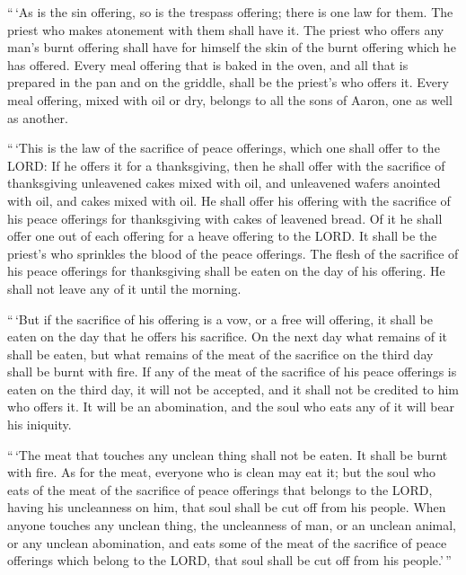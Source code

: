  ``\,`As is the sin offering, so is the trespass offering;
there is one law for them. The priest who makes atonement with them
shall have it.  The priest who offers any man's burnt
offering shall have for himself the skin of the burnt offering which he
has offered.  Every meal offering that is baked in the oven,
and all that is prepared in the pan and on the griddle, shall be the
priest's who offers it.  Every meal offering, mixed with
oil or dry, belongs to all the sons of Aaron, one as well as another.

 ``\,`This is the law of the sacrifice of peace offerings,
which one shall offer to the LORD:  If he offers it for a
thanksgiving, then he shall offer with the sacrifice of thanksgiving
unleavened cakes mixed with oil, and unleavened wafers anointed with
oil, and cakes mixed with oil.  He shall offer his offering
with the sacrifice of his peace offerings for thanksgiving with cakes of
leavened bread.  Of it he shall offer one out of each
offering for a heave offering to the LORD. It shall be the priest's who
sprinkles the blood of the peace offerings.  The flesh of
the sacrifice of his peace offerings for thanksgiving shall be eaten on
the day of his offering. He shall not leave any of it until the morning.

 ``\,`But if the sacrifice of his offering is a vow, or a
free will offering, it shall be eaten on the day that he offers his
sacrifice. On the next day what remains of it shall be eaten,
 but what remains of the meat of the sacrifice on the third
day shall be burnt with fire.  If any of the meat of the
sacrifice of his peace offerings is eaten on the third day, it will not
be accepted, and it shall not be credited to him who offers it. It will
be an abomination, and the soul who eats any of it will bear his
iniquity.

 ``\,`The meat that touches any unclean thing shall not be
eaten. It shall be burnt with fire. As for the meat, everyone who is
clean may eat it;  but the soul who eats of the meat of the
sacrifice of peace offerings that belongs to the LORD, having his
uncleanness on him, that soul shall be cut off from his people.
 When anyone touches any unclean thing, the uncleanness of
man, or an unclean animal, or any unclean abomination, and eats some of
the meat of the sacrifice of peace offerings which belong to the LORD,
that soul shall be cut off from his people.'\,''

